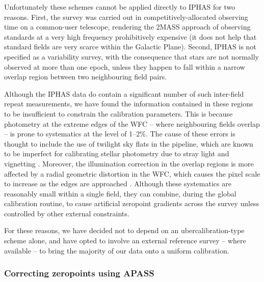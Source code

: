 \documentclass[useAMS,usenatbib]{mn2e}
\begin{document}
Unfortunately these schemes cannot be applied
directly to IPHAS
for two reasons. 
First, the survey was carried out 
in competitively-allocated observing time on a
common-user telescope, 
rendering the 2MASS approach 
of observing standards at a very high frequency
prohibitively expensive (it does not help that 
standard fields 
are very scarce within the Galactic Plane).
Second, IPHAS is not specified as a variability survey, with
the consequence that stars are not normally observed at more 
than one epoch,
unless they happen to fall within a narrow overlap region 
between two neighbouring field pairs.

Although the IPHAS data do contain a significant number of 
such inter-field repeat measurements,
we have found the information contained
in these regions to be insufficient
to constrain the calibration parameters.
This is because photometry at the extreme edges of the WFC
-- where neighbouring fields overlap -- 
is prone to systematics at the level of 1--2\%.
The cause of these errors is thought to include 
the use of twilight sky flats in the pipeline,
which are known to be imperfect for calibrating stellar photometry 
due to stray light and vignetting \citep[e.g.][]{Manfroid1995}.
Moreover, the illumination correction in the overlap regions
is more affected by a radial geometric distortion in the WFC,
which causes the pixel scale to increase as the edges 
are approached \citep{Gonzalez-Solares2011}.
Although these systematics are reasonably small within a single field,
they can combine, during the global calibration routine, to cause artificial zeropoint gradients 
across the survey unless controlled by
other external constraints.

For these reasons, we have decided not to depend
on an ubercalibration-type scheme alone,
and have opted to involve an external reference survey
-- where available --
to bring the majority of our data onto a uniform calibration.

\subsubsection{Correcting zeropoints using APASS}
\end{document}

